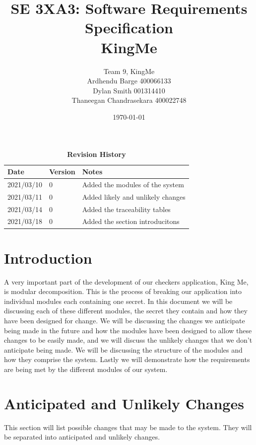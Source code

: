 \documentclass[12pt, titlepage]{article}
\title{SE 3XA3: Software Requirements Specification\\KingMe}
\author{Team 9, KingMe
		\\ Ardhendu Barge 400066133
		\\ Dylan Smith 001314410
		\\ Thaneegan Chandrasekara 400022748
}
\date{\today}
\begin{document}
\maketitle

\tableofcontents
\listoftables
\listoffigures

\begin{table}[!ht]
\caption{\bf Revision History}
\begin{tabularx}{\textwidth}{p{3cm}p{2cm}X}
\toprule {\bf Date} & {\bf Version} & {\bf Notes}\\
\midrule
2021/03/10 & 0 & Added the modules of the system\\
2021/03/11 & 0 & Added likely and unlikely changes\\
2021/03/14 & 0 & Added the traceability tables\\
2021/03/18 & 0 & Added the section introducitons\\
\bottomrule
\end{tabularx}
\end{table}

\newpage


\section{Introduction}

A very important part of the development of our checkers application, King Me, is modular decomposition. This is the process of breaking our application into individual modules each containing one secret. In this document we will be discussing each of these different modules, the secret they contain and how they have been designed for change. We will be discussing the changes we anticipate being made in the future and how the modules have been designed to allow these changes to be easily made, and we will discuss the unlikely changes that we don't anticipate being made. We will be discussing the structure of the modules and how they comprise the system. Lastly we will demonstrate how the requirements are being met by the different modules of our system.

\section{Anticipated and Unlikely Changes} \label{SecChange}
This section will list possible changes that may be made to the system. They will be separated into anticipated and unlikely changes.
\end{document}
